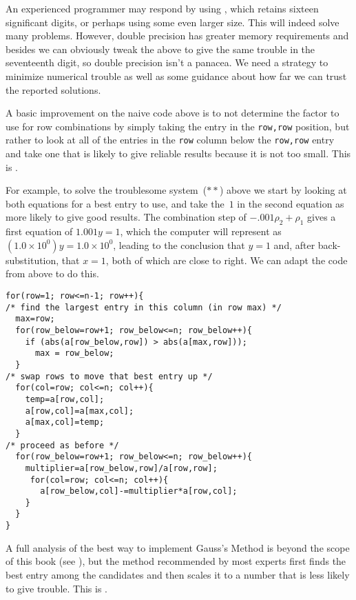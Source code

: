 An experienced programmer may respond by using
, %
which retains sixteen significant digits, 
or perhaps using some even larger size.
This will indeed solve many problems.
However, double precision has greater memory requirements
and besides we can obviously tweak the above to give the
same trouble in the seventeenth digit, so double precision
isn't a panacea.
We need a strategy to minimize numerical
trouble
as well as some guidance about how far we can trust the reported 
solutions.

A basic improvement on the naive code above 
is to not determine the factor to use for row combinations
by simply taking the entry in the \lstinline[style=inline]!row,row! position,
but rather to look at all of the entries in the \lstinline[style=inline]!row!
column below the \lstinline[style=inline]!row,row! entry
and take one that is likely to give reliable results
because it is not too small.
This is .%

For example, to solve the troublesome system~($**$) above
we start by looking at both equations for a best entry to use, 
and take the~$1$ in
the second equation as more likely to give good results.
The combination step of $-.001\rho_2+\rho_1$ gives a first equation of 
$1.001y=1$, which the computer will represent as 
$(1.0\times 10^{0})y=1.0\times 10^{0}$, leading to the conclusion that 
$y=1$ and, after back-substitution, that $x=1$, 
both of which are close to right.  
We can adapt the code from above to do this.
\begin{lstlisting}
for(row=1; row<=n-1; row++){
/* find the largest entry in this column (in row max) */
  max=row;
  for(row_below=row+1; row_below<=n; row_below++){
    if (abs(a[row_below,row]) > abs(a[max,row]));
      max = row_below;
  }
/* swap rows to move that best entry up */
  for(col=row; col<=n; col++){
    temp=a[row,col];
    a[row,col]=a[max,col];
    a[max,col]=temp;
  }
/* proceed as before */
  for(row_below=row+1; row_below<=n; row_below++){
    multiplier=a[row_below,row]/a[row,row];
     for(col=row; col<=n; col++){
       a[row_below,col]-=multiplier*a[row,col];
    }
  }
}
\end{lstlisting}

A full analysis of the best way to implement Gauss's Method 
is beyond the scope of this book (see \cite{Wilkinson65}),
but the method recommended by most experts 
first finds the best entry
among the candidates and then scales it to a number that is less
likely to give trouble.
This is 
.

